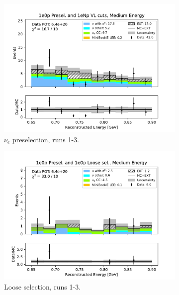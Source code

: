 \begin{figure}[H]
    \centering
    \begin{subfigure}{0.5\linewidth}
        \includegraphics[width=\linewidth]{technote/Sidebands/Figures/NearSideband/near_sideband_reco_e_run123_ZP_ZP_MEDIUM_ENERGY.pdf}
        \caption{$\nu_e$ preselection, runs 1-3.}
    \end{subfigure}%
    \begin{subfigure}{0.5\linewidth}
        \includegraphics[width=\linewidth]{technote/Sidebands/Figures/NearSideband/near_sideband_reco_e_run123_ZP_ZPLOOSESEL_MEDIUM_ENERGY.pdf}
        \caption{Loose selection, runs 1-3.}
    \end{subfigure}
    \begin{subfigure}{0.5\linewidth}

\end{subfigure}
\end{figure}
